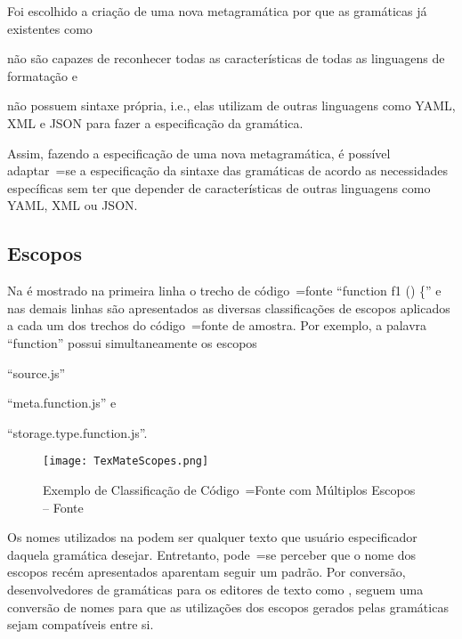 Foi escolhido a criação de uma nova metagramática por que as gramáticas já existentes como 
\begin{inparaenum}[1)]
\item não são capazes de reconhecer todas as características de todas as linguagens de formatação e
\item não possuem sintaxe própria,
i.e.,
elas utilizam de outras linguagens como YAML,
XML e
JSON para fazer a especificação da gramática.
\end{inparaenum}
Assim,
fazendo a especificação de uma nova metagramática,
é possível adaptar~=se a especificação da sintaxe das gramáticas de acordo as necessidades específicas sem ter que depender de características de outras linguagens como YAML,
XML ou
JSON.


\subsection{Escopos}

Na  é mostrado na primeira linha o trecho de código~=fonte ``function f1 () \{'' e
nas demais linhas são apresentados as diversas classificações de escopos aplicados a cada um dos trechos do código~=fonte de amostra.
Por exemplo, a palavra ``function'' possui simultaneamente os escopos
\begin{inparaenum}[1)]
\item ``source.js''
\item ``meta.function.js'' e
\item ``storage.type.function.js''.
\end{inparaenum}
\begin{figure}[h]
\centering
\texttt{[image: TexMateScopes.png]}
\caption[Exemplo de Classificação de Código~=Fonte com Múltiplos Escopos]{Exemplo de Classificação de Código~=Fonte com Múltiplos Escopos -- Fonte }
\label{TexMateScopes}
\end{figure}

Os nomes utilizados na  podem ser qualquer texto que usuário especificador daquela gramática desejar.
Entretanto,
pode~=se perceber que o nome dos escopos recém apresentados aparentam seguir um padrão.
Por conversão,
desenvolvedores de gramáticas para os editores de texto como ,
seguem uma conversão de nomes para que as utilizações dos escopos gerados pelas gramáticas sejam compatíveis entre si.

